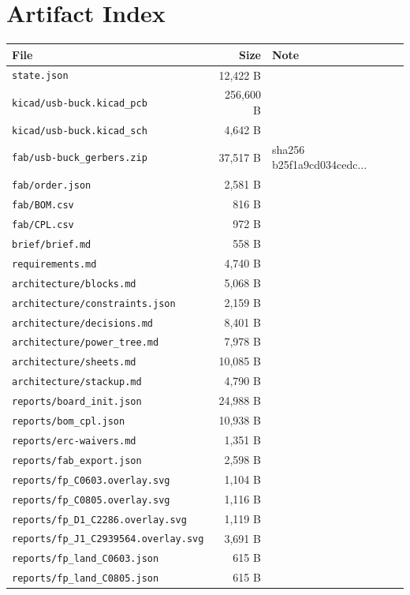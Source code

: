 \documentclass[11pt,a4paper]{article}
\begin{document}
\section{Artifact Index}
{\small
\begin{longtable}{p{9cm}rp{4cm}}
\toprule
\textbf{File} & \textbf{Size} & \textbf{Note} \\
\midrule
\endhead
\texttt{state.json} & 12,422 B &  \\
\texttt{kicad/usb-buck.kicad\_pcb} & 256,600 B &  \\
\texttt{kicad/usb-buck.kicad\_sch} & 4,642 B &  \\
\texttt{fab/usb-buck\_gerbers.zip} & 37,517 B & sha256 b25f1a9cd034cedc... \\
\texttt{fab/order.json} & 2,581 B &  \\
\texttt{fab/BOM.csv} & 816 B &  \\
\texttt{fab/CPL.csv} & 972 B &  \\
\texttt{brief/brief.md} & 558 B &  \\
\texttt{requirements.md} & 4,740 B &  \\
\texttt{architecture/blocks.md} & 5,068 B &  \\
\texttt{architecture/constraints.json} & 2,159 B &  \\
\texttt{architecture/decisions.md} & 8,401 B &  \\
\texttt{architecture/power\_tree.md} & 7,978 B &  \\
\texttt{architecture/sheets.md} & 10,085 B &  \\
\texttt{architecture/stackup.md} & 4,790 B &  \\
\texttt{reports/board\_init.json} & 24,988 B &  \\
\texttt{reports/bom\_cpl.json} & 10,938 B &  \\
\texttt{reports/erc-waivers.md} & 1,351 B &  \\
\texttt{reports/fab\_export.json} & 2,598 B &  \\
\texttt{reports/fp\_C0603.overlay.svg} & 1,104 B &  \\
\texttt{reports/fp\_C0805.overlay.svg} & 1,116 B &  \\
\texttt{reports/fp\_D1\_C2286.overlay.svg} & 1,119 B &  \\
\texttt{reports/fp\_J1\_C2939564.overlay.svg} & 3,691 B &  \\
\texttt{reports/fp\_land\_C0603.json} & 615 B &  \\
\texttt{reports/fp\_land\_C0805.json} & 615 B &  \\

\end{longtable}}
\end{document}
